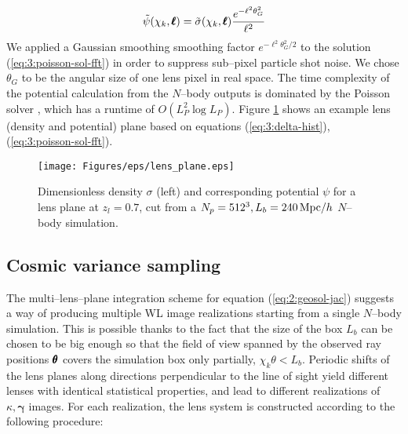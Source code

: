 \begin{equation}
\label{eq:3:poisson-sol-fft}
\tilde{\psi}(\chi_k,\pmb{\ell}) = \tilde{\sigma}(\chi_k,\pmb{\ell})\frac{e^{-\ell^2\theta_G^2}}{\ell^2}
\end{equation} 
%
We applied a Gaussian smoothing smoothing factor $e^{-\ell^2\theta_G^2/2}$ to the solution (\ref{eq:3:poisson-sol-fft}) in order to suppress sub--pixel particle shot noise. We chose $\theta_G$ to be the angular size of one lens pixel in real space. The time complexity of the potential calculation from the $N$--body outputs is dominated by the Poisson solver \citep{lenstools}, which has a runtime of $O(L_P^2\log L_P)$. Figure \ref{fig:3:lens} shows an example lens (density and potential) plane based on equations (\ref{eq:3:delta-hist}), (\ref{eq:3:poisson-sol-fft}). 

\begin{figure}
\begin{center}
\texttt{[image: Figures/eps/lens\_plane.eps]}
\end{center}
\caption{Dimensionless density $\sigma$ (left) and corresponding potential $\psi$ for a lens plane at $z_l=0.7$, cut from a $N_p=512^3, L_b=240\,{\rm Mpc}/h$ $N$--body simulation.}
\label{fig:3:lens}
\end{figure}

\subsection{Cosmic variance sampling}
\label{sec:3:sampling}
The multi--lens--plane integration scheme for equation (\ref{eq:2:geosol-jac}) suggests a way of producing multiple WL image realizations starting from a single $N$--body simulation. This is possible thanks to the fact that the size of the box $L_b$ can be chosen to be big enough so that the field of view spanned by the observed ray positions $\pmb{\theta}$ covers the simulation box only partially, $\chi_k\theta<L_b$. Periodic shifts of the lens planes along directions perpendicular to the line of sight yield different lenses with identical statistical properties, and lead to different realizations of $\kappa,\pmb{\gamma}$ images. For each realization, the lens system is constructed according to the following procedure:

